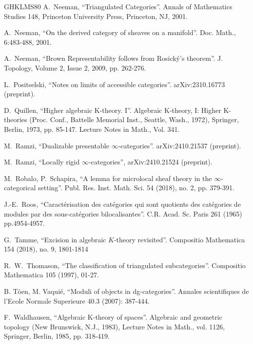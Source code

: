 \documentclass[11pt,leqno]{amsart}
\numberwithin{equation}{section}
\begin{document}
\begin{thebibliography}{GHKLMS80}
 A.~Neeman, ``Triangulated Categories''. Annals of Mathematics Studies 148, Princeton University Press, Princeton, NJ, 2001.

 A.~Neeman, ``On the derived category of sheaves on a manifold''. Doc. Math., 6:483-488, 2001.

 A.~Neeman, ``Brown Representability follows from Rosick\'y's theorem''. J. Topology, Volume 2, Issue 2, 2009, pp. 262-276.

 L.~Positselski, ``Notes on limits of accessible categories''. arXiv:2310.16773 (preprint).  

 D.~Quillen, ``Higher algebraic K-theory. I''. Algebraic K-theory, I: Higher K-theories
(Proc. Conf., Battelle Memorial Inst., Seattle, Wash., 1972), Springer, Berlin, 1973,
pp. 85-147. Lecture Notes in Math., Vol. 341.


 M.~Ramzi, ``Dualizable presentable $\infty$-categories''. arXiv:2410.21537 (preprint).

M.~Ramzi, ``Locally rigid $\infty$-categories'', arXiv:2410.21524 (preprint).

 M.~Robalo, P.~Schapira, ``A lemma for microlocal sheaf theory in the $\infty$-categorical setting''. Publ. Res. Inst. Math. Sci. 54 (2018), no. 2, pp. 379-391.

J.-E.~Roos, ``Caract\'erisation des cat\'egories qui sont quotients des cat\'egories de modules
par des sous-cat\'egories bilocalisantes''. C.R. Acad. Sc. Paris 261 (1965) pp.4954-4957.

 G.~Tamme, ``Excision in algebraic $K$-theory revisited''. Compositio Mathematica 154 (2018), no. 9, 1801-1814

R.~W.~Thomason, ``The classification of triangulated subcategories''. Compositio Mathematica 105 (1997), 01-27.

 B. T\"oen, M. Vaqui\'e, ``Moduli of objects in dg-categories''. Annales scientifiques de l'Ecole Normale
Superieure 40.3 (2007): 387-444.

F.~Waldhausen, ``Algebraic K-theory of spaces''. Algebraic and geometric topology (New Brunswick, N.J., 1983), Lecture Notes in Math., vol. 1126, Springer, Berlin,
1985, pp. 318-419.

\end{thebibliography}
\end{document}
